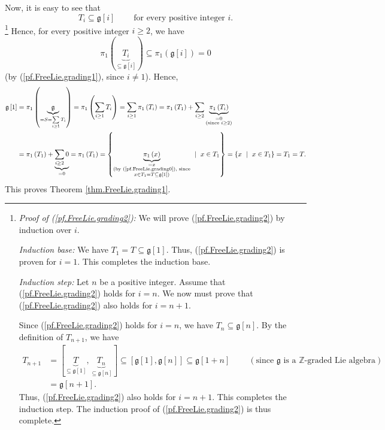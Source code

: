\documentclass[etingof-lie.tex]{subfiles}
\begin{document}
\begin{verlong}
Now, it is easy to see that%
\begin{equation}
T_{i}\subseteq\mathfrak{g}\left[  i\right]  \ \ \ \ \ \ \ \ \ \ \text{for
every positive integer }i. \label{pf.FreeLie.grading2}%
\end{equation}
\footnote{\textit{Proof of (\ref{pf.FreeLie.grading2}):} We will prove
(\ref{pf.FreeLie.grading2}) by induction over $i$.
\par
\textit{Induction base:} We have $T_{1}=T\subseteq\mathfrak{g}\left[
1\right]  $. Thus, (\ref{pf.FreeLie.grading2}) is proven for $i=1$. This
completes the induction base.
\par
\textit{Induction step:} Let $n$ be a positive integer. Assume that
(\ref{pf.FreeLie.grading2}) holds for $i=n$. We now must prove that
(\ref{pf.FreeLie.grading2}) also holds for $i=n+1$.
\par
Since (\ref{pf.FreeLie.grading2}) holds for $i=n$, we have $T_{n}%
\subseteq\mathfrak{g}\left[  n\right]  $. By the definition of $T_{n+1}$, we
have
\begin{align*}
T_{n+1}  &  =\left[  \underbrace{T}_{\subseteq\mathfrak{g}\left[  1\right]
},\underbrace{T_{n}}_{\subseteq\mathfrak{g}\left[  n\right]  }\right]
\subseteq\left[  \mathfrak{g}\left[  1\right]  ,\mathfrak{g}\left[  n\right]
\right]  \subseteq\mathfrak{g}\left[  1+n\right]  \ \ \ \ \ \ \ \ \ \ \left(
\text{since }\mathfrak{g}\text{ is a }\mathbb{Z}\text{-graded Lie
algebra}\right) \\
&  =\mathfrak{g}\left[  n+1\right]  .
\end{align*}
Thus, (\ref{pf.FreeLie.grading2}) also holds for $i=n+1$. This completes the
induction step. The induction proof of (\ref{pf.FreeLie.grading2}) is thus
complete.} Hence, for every positive integer $i\geq2$, we have%
\[
\pi_{1}\left(  \underbrace{T_{i}}_{\subseteq\mathfrak{g}\left[  i\right]
}\right)  \subseteq\pi_{1}\left(  \mathfrak{g}\left[  i\right]  \right)  =0
\]
(by (\ref{pf.FreeLie.grading1}), since $i\neq1$). Hence,%
\begin{align*}
\mathfrak{g}\left[  1\right]   &  =\pi_{1}\left(  \underbrace{\mathfrak{g}%
}_{=S=\sum\limits_{i\geq1}T_{i}}\right)  =\pi_{1}\left(  \sum\limits_{i\geq
1}T_{i}\right)  =\sum\limits_{i\geq1}\pi_{1}\left(  T_{i}\right)  =\pi
_{1}\left(  T_{1}\right)  +\sum\limits_{i\geq2}\underbrace{\pi_{1}\left(
T_{i}\right)  }_{\substack{=0\\\text{(since }i\geq2\text{)}}}\\
&  =\pi_{1}\left(  T_{1}\right)  +\underbrace{\sum\limits_{i\geq2}0}_{=0}%
=\pi_{1}\left(  T_{1}\right)  =\left\{  \underbrace{\pi_{1}\left(  x\right)
}_{\substack{=x\\\text{(by (\ref{pf.FreeLie.grading0}), since}\\x\in
T_{1}=T\subseteq\mathfrak{g}\left[  1\right]  \text{)}}}\ \mid\ x\in
T_{1}\right\}  =\left\{  x\ \mid\ x\in T_{1}\right\}  =T_{1}=T.
\end{align*}
This proves Theorem \ref{thm.FreeLie.grading1}.
\end{verlong}
\end{document}
